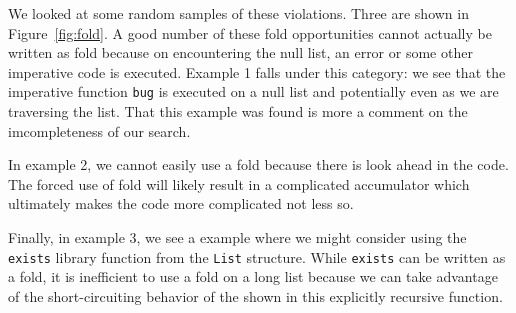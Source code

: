 \documentclass[12pt,abstracton]{scrartcl}
\begin{document}
We looked at some random
samples of these violations. Three are shown in Figure~\ref{fig:fold}.
A good number of these fold opportunities cannot actually
be written as fold because on encountering the null list, an error or
some other imperative code is executed. Example 1 falls under this category:
we see that the imperative function \texttt{bug} is executed
on a null list and potentially even as we are traversing the list.
That this example was found is more a comment on the imcompleteness
of our search.

In example 2, we cannot easily use a fold because there is look ahead
in the code. The forced use of fold will likely result in a complicated
accumulator which ultimately makes the code more complicated not less so.

Finally, in example 3, we see a example where we might consider
using the \texttt{exists} library function from the \texttt{List}
structure. While \texttt{exists} can be written as a fold,
it is inefficient to use a fold on a long list because
we can take advantage of the short-circuiting behavior
of the shown in this explicitly recursive function.
\end{document}
